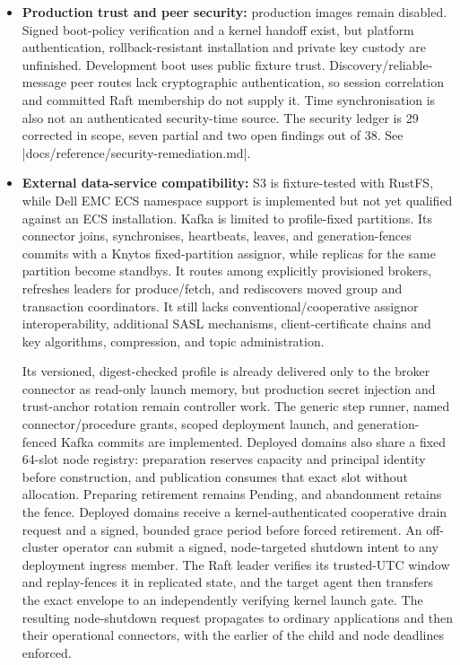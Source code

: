 \begin{itemize}
    \item \textbf{Production trust and peer security:} production images remain
        disabled. Signed boot-policy verification and a kernel handoff exist,
        but platform authentication, rollback-resistant installation and private
        key custody are unfinished. Development boot uses public fixture trust.
        Discovery/reliable-message peer routes lack cryptographic authentication, so
        session correlation and committed Raft membership do not supply it.
        Time synchronisation is also not an authenticated security-time source.
        The security ledger is 29 corrected in scope, seven partial and two
        open findings out of 38. See
        \repofile|docs/reference/security-remediation.md|.
    \item \textbf{External data-service compatibility:} S3 is fixture-tested
        with RustFS, while Dell EMC ECS namespace support is implemented but
        not yet qualified against an ECS installation. Kafka is limited to
        profile-fixed partitions. Its connector joins, synchronises,
        heartbeats, leaves, and generation-fences commits with a Knytos
        fixed-partition assignor, while replicas for the same partition become
        standbys. It routes among explicitly provisioned brokers, refreshes
        leaders for produce/fetch, and rediscovers moved group and transaction
        coordinators. It still lacks conventional/cooperative assignor
        interoperability, additional SASL
        mechanisms, client-certificate chains and key algorithms, compression,
        and topic administration.
        
        Its versioned, digest-checked profile is already delivered only to the
        broker connector as read-only launch memory, but production secret injection
        and trust-anchor rotation remain controller work. The generic step
        runner, named connector/procedure grants, scoped deployment launch, and
        generation-fenced Kafka commits are implemented. Deployed domains also
        share a fixed 64-slot node registry: preparation reserves capacity and
        principal identity before construction, and publication consumes that
        exact slot without allocation. Preparing retirement remains Pending, and
        abandonment retains the fence. Deployed domains
        receive a kernel-authenticated cooperative drain request and a signed,
        bounded grace period before forced retirement. An off-cluster operator
        can submit a signed, node-targeted shutdown intent to any deployment
        ingress member. The Raft leader verifies its trusted-UTC window and
        replay-fences it in replicated state, and the target agent then transfers
        the exact envelope to an independently verifying kernel launch gate.
        The resulting node-shutdown request propagates to ordinary applications
        and then their operational connectors, with the earlier of the child
        and node deadlines enforced.
        

\end{itemize}
